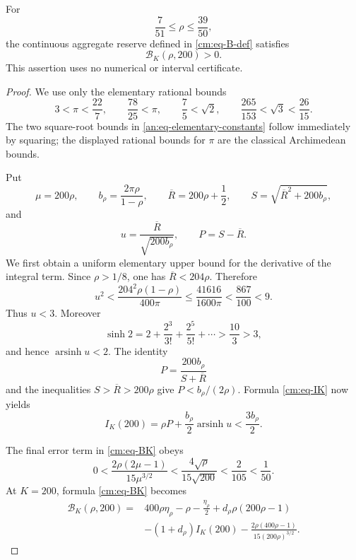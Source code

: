 
\begin{lemma}
\label{an:lem-BK200-positive}
For
\[
        \frac7{51}\leq \rho\leq\frac{39}{50},
\]
the continuous aggregate reserve defined in
\eqref{cm:eq-B-def} satisfies
\[
        \mathcal B_K(\rho,200)>0.
\]
This assertion uses no numerical or interval certificate.
\end{lemma}

\begin{proof}
We use only the elementary rational bounds
\begin{equation}
  3<\pi<\frac{22}{7},\qquad
  \frac{78}{25}<\pi,
  \qquad
  \frac75<\sqrt2,
  \qquad
  \frac{265}{153}<\sqrt3<\frac{26}{15}.
  \label{an:eq-elementary-constants}
\end{equation}
The two square-root bounds in \eqref{an:eq-elementary-constants} follow
immediately by squaring; the displayed rational bounds for \(\pi\) are the
classical Archimedean bounds.

Put
\[
  \mu=200\rho,
  \qquad
  b_\rho=\frac{2\pi\rho}{1-\rho},
  \qquad
  \overline R=200\rho+\frac12,
  \qquad
  S=\sqrt{\overline R^2+200b_\rho},
\]
and
\[
  u=\frac{\overline R}{\sqrt{200b_\rho}},
  \qquad P=S-\overline R.
\]
We first obtain a uniform elementary upper bound for the derivative of the
integral term.  Since \(\rho>1/8\), one has
\(\overline R<204\rho\).  Therefore
\[
 u^2
 <\frac{204^2\rho(1-\rho)}{400\pi}
 \leq\frac{41616}{1600\pi}
 <\frac{867}{100}<9.
\]
Thus \(u<3\).  Moreover
\[
 \sinh 2=2+\frac{2^3}{3!}+\frac{2^5}{5!}+\cdots
 >\frac{10}{3}>3,
\]
and hence \(\operatorname{arsinh}u<2\).  The identity
\[
 P=\frac{200b_\rho}{S+\overline R}
\]
and the inequalities \(S>\overline R>200\rho\) give
\(P<b_\rho/(2\rho)\).  Formula \eqref{cm:eq-IK} now yields
\begin{equation}
 I_K(200)
 =\rho P+\frac{b_\rho}{2}\operatorname{arsinh}u
 <\frac{3b_\rho}{2}.
 \label{an:eq-IK-simple-upper}
\end{equation}

The final error term in \eqref{cm:eq-BK} obeys
\begin{equation}
 0<\frac{2\rho(2\mu-1)}{15\mu^{3/2}}
 <\frac{4\sqrt\rho}{15\sqrt{200}}
 <\frac{2}{105}<\frac1{50}.
 \label{an:eq-BK-error-upper}
\end{equation}
At \(K=200\), formula \eqref{cm:eq-BK} becomes
\begin{equation}
\begin{split}
 \mathcal B_K(\rho,200)
 ={}&400\rho\eta_\rho-\rho-\frac{\eta_\rho}{2}
 +d_\rho\rho(200\rho-1)\\
 &-(1+d_\rho)I_K(200)
 -\frac{2\rho(400\rho-1)}{15(200\rho)^{3/2}}.
\end{split}
\label{an:eq-BK200-expanded}
\end{equation}


\end{proof}
